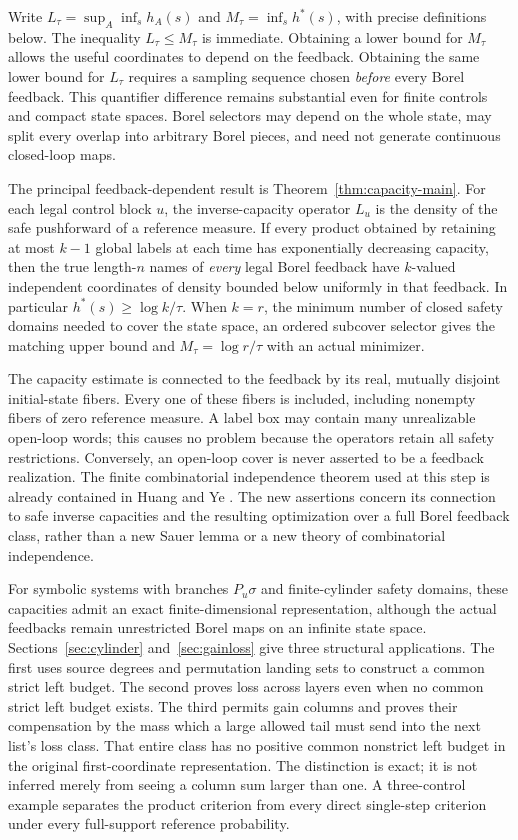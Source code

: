 \documentclass[11pt,reqno]{amsart}
\numberwithin{equation}{section}
\theoremstyle{definition}
\begin{document}
Write $L_\tau=\sup_A\inf_s h_A(s)$ and
$M_\tau=\inf_s h^*(s)$, with precise definitions below. The inequality
$L_\tau\le M_\tau$ is immediate. Obtaining a lower bound for $M_\tau$
allows the useful coordinates to depend on the feedback. Obtaining the
same lower bound for $L_\tau$ requires a sampling sequence chosen
\emph{before} every Borel feedback. This quantifier difference remains
substantial even for finite controls and compact state spaces. Borel
selectors may depend on the whole state, may split every overlap into
arbitrary Borel pieces, and need not generate continuous closed-loop
maps.

The principal feedback-dependent result is
Theorem~\ref{thm:capacity-main}. For each legal control block $u$, the
inverse-capacity operator $L_u$ is the density of the safe pushforward
of a reference measure. If every product obtained by retaining at most
$k-1$ global labels at each time has exponentially decreasing capacity,
then the true length-$n$ names of \emph{every} legal Borel feedback have
$k$-valued independent coordinates of density bounded below uniformly
in that feedback. In particular $h^*(s)\ge\log k/\tau$. When $k=r$,
the minimum number of closed safety domains needed to cover the state
space, an ordered subcover selector gives the matching upper bound
and $M_\tau=\log r/\tau$ with an actual minimizer.

The capacity estimate is connected to the feedback by its real,
mutually disjoint initial-state fibers. Every one of these fibers is
included, including nonempty fibers of zero reference measure. A label
box may contain many unrealizable open-loop words; this causes no
problem because the operators retain all safety restrictions. Conversely,
an open-loop cover is never asserted to be a feedback realization.
The finite combinatorial independence theorem used at this step is
already contained in Huang and Ye \cite[Section~4, Lemma~4.1 and
Remark~4.2]{HuangYe2009}. The new assertions concern its connection to
safe inverse capacities and the resulting optimization over a full
Borel feedback class, rather than a new Sauer lemma or a new theory of
combinatorial independence.

For symbolic systems with branches $P_u\sigma$ and finite-cylinder
safety domains, these capacities admit an exact finite-dimensional
representation, although the actual feedbacks remain unrestricted
Borel maps on an infinite state space. Sections~\ref{sec:cylinder}
and~\ref{sec:gainloss} give three structural applications. The first
uses source degrees and permutation landing sets to construct a common
strict left budget. The second proves loss across layers even when no
common strict left budget exists. The third permits gain columns and
proves their compensation by the mass which a large allowed tail must
send into the next list's loss class. That entire class has no positive
common nonstrict left budget in the original first-coordinate
representation. The distinction is exact; it is not inferred merely
from seeing a column sum larger than one. A three-control example
separates the product criterion from every direct single-step criterion
under every full-support reference probability.
\end{document}
